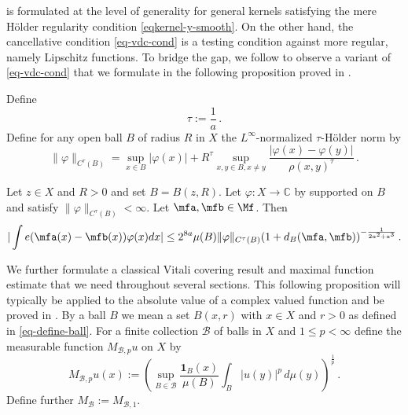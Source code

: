  is formulated at the level of generality
for general kernels satisfying the mere H\"older regularity condition \eqref{eqkernel-y-smooth}. On the other hand, the cancellative condition \eqref{eq-vdc-cond} is a testing condition against more regular,
namely Lipschitz functions. To bridge the gap, we follow \cite{zk-polynomial} to observe a variant of \eqref{eq-vdc-cond} that we formulate
in the following proposition proved in .


Define
\begin{equation}
    \tau:=\frac 1a\, .
\end{equation}
Define for any open ball $B$ of radius $R$ in $X$ the $L^\infty$-normalized $\tau$-H\"older norm by
\begin{equation}
    \label{eq-Holder-norm}
    \|\varphi\|_{C^\tau(B)} = \sup_{x \in B} |\varphi(x)| + R^\tau \sup_{x,y \in B, x \neq y} \frac{|\varphi(x) - \varphi(y)|}{\rho(x,y)^\tau}\,.
\end{equation}


\begin{proposition}
    \label{Holder-van-der-Corput}
    \leanok
     Let $z\in X$ and $R>0$ and set $B=B(z,R)$.
     Let $\varphi: X \to \mathbb{C}$ by
     supported on $B$ and satisfy $\|{\varphi}\|_{C^\tau(B)}<\infty$.
     Let $\mfa, \mfb \in \Mf$. Then
    \begin{equation}
        \label{eq-vdc-cond-tau-2}
        |\int e(\mfa(x)-{\mfb(x)})\varphi(x) dx|\le
         2^{8a} \mu(B) \|{\varphi}\|_{C^\tau(B)}
       (1 + d_{B}(\mfa,\mfb))^{-\frac{1}{2a^2+a^3}}
    \,.
    \end{equation}
\end{proposition}

We further formulate a classical Vitali covering result
and maximal function estimate that we need throughout several sections.
This following proposition will typically be applied to the absolute value of a complex valued function and be proved in . By a ball $B$ we mean a set $B(x,r)$ with $x\in X$
and $r>0$ as defined in \eqref{eq-define-ball}.
For a finite collection $\mathcal{B}$ of balls in $X$
and $1\le p< \infty$ define the measurable function $M_{\mathcal{B},p}u$ on $X$ by
\begin{equation}\label{def-hlm}
M_{\mathcal{B},p}u(x):=\left(\sup_{B\in \mathcal{B}} \frac{\mathbf{1}_{B}(x)}{\mu(B)}\int _{B} |u(y)|^p\, d\mu(y)\right)^\frac 1p\, .
\end{equation}
Define further $M_{\mathcal{B}}:=M_{\mathcal{B},1}$.


